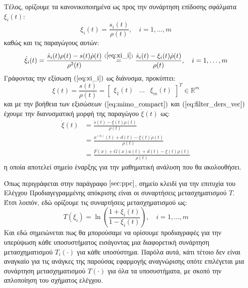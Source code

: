 Τέλος, ορίζουμε τα κανονικοποιημένα ως προς την συνάρτηση επίδοσης σφάλματα $\xi_i(t)$:
\begin{equation}
	\xi_i(t) = \frac{s_i(t)}{\rho(t)}, \quad i=1,\dots,m
	\label{eq:xi_i}
\end{equation}
καθώς και τις παραγώγους αυτών:
\begin{equation}
	\dot{\xi}_i(t) =
	\frac{\dot{s}_i(t) \rho(t) - s(t) \dot{\rho}(t)}
	{\rho^2(t)} \stackrel{(\ref{eq:xi_i})}{=}
	\frac{\dot{s}_i(t) - \xi_i(t) \dot{\rho}(t)}{\rho(t)},
	\quad i=1,\dots,m
	\label{eq:xi_i_dot}
\end{equation}
Γράφοντας την εξίσωση $(\ref{eq:xi_i})$ ως διάνυσμα, προκύπτει:
\begin{equation}
	\xi(t) = \frac{s(t)}{\rho(t)} = \begin{bmatrix}\xi_1(t) & \dots & \xi_m(t)\end{bmatrix}^T 
	\in \mathbb{R}^m
\end{equation}
και με την βοήθεια των εξισώσεων $(\ref{eq:mimo_compact})$ και  $(\ref{eq:filter_ders_vec})$ έχουμε την διανυσματική μορφή της παραγώγου $\dot{\xi}(t)$ ως:
\begin{equation}
\begin{split}
\dot{\xi}(t) &= \frac{\dot{s}(t) - \xi(t) \dot{\rho}(t)}{\rho(t)} \\
             &= \frac{x^{(n)}(t) + d(t) - \xi(t) \dot{\rho}(t)}{\rho(t)}\\
             &=\frac{F(x) + G(x)u(t) + d(t) - \xi(t)\dot{\rho}(t)}{\rho(t)}
\end{split}
\label{eq:xi_dot}
\end{equation}
η οποία αποτελεί σημείο έναρξης για την μαθηματική ανάλυση που θα ακολουθήσει.

Όπως περιγράφεται στην παράγραφο $\ref{sec:ppc}$, σημείο κλειδί για την επιτυχία του Ελέγχου Προδιαγεγραμμένης απόκρισης είναι οι συναρτήσεις μετασχηματισμού $T$. Έτσι λοιπόν, εδώ ορίζουμε τις συναρτήσεις μετασχηματισμού ως:
\begin{equation}
	T(\xi_i) = \ln \left( \frac{1 + \xi_i(t)}{1 - \xi_i(t)} \right),
	\quad i=1,\dots,m
\end{equation}
Και εδώ σημειώνεται πως θα μπορούσαμε να ορίσουμε προδιαγραφές για την υπερύψωση κάθε υποσυστήματος εισάγοντας μια διαφορετική συνάρτηση μετασχηματισμού $T_i(\cdot)$ για κάθε υποσύστημα. Παρόλα αυτά, κάτι τέτοιο δεν είναι αναγκαίο για τις ανάγκες της παρούσας εφαρμογής αναγνώρισης οπότε επιλέγεται μια συνάρτηση μετασχηματισμού $T(\cdot)$ για όλα τα υποσυστήματα, με σκοπό την απλοποίηση του σχήματος ελέγχου.

